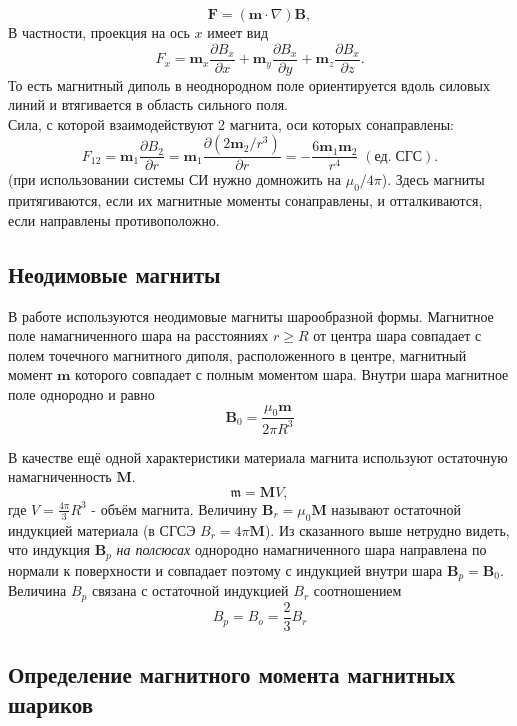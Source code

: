 \documentclass[a4paper, 12pt]{article}
\begin{document}
	\[\textbf{F} = (\mathbf{m} \cdot \nabla)\textbf{B},\]
	 В частности, проекция на ось $x$ имеет вид
	\begin{equation*}
		F_x = \mathbf{m}_x\frac{\partial B_x}{\partial x} + \mathbf{m}_y\frac{\partial B_x}{\partial y} + \mathbf{m}_z\frac{\partial B_x}{\partial z}.
	\end{equation*}
	То есть магнитный диполь в неоднородном поле ориентируется вдоль силовых линий и втягивается в область сильного поля.\\
	Сила, с которой взаимодействуют 2 магнита, оси которых сонаправлены:
	\begin{equation}
		\label{6}
		F_{12}= \mathbf{m}_1 \frac{\partial{B_2}}{\partial{r}} = \mathbf{m}_1\frac{\partial{(2\mathbf{m}_2/r^3)}}{\partial{r}} = -\frac{6 \mathbf{m}_1\mathbf{m}_2}{r^4} \;(\text{ед}.\; \text{СГС}).
	\end{equation}
	(при использовании системы СИ нужно домножить на $\mu_0 / 4\pi$). Здесь магниты притягиваются, если их магнитные моменты сонаправлены, и отталкиваются, если направлены противоположно.
	
	
	\subsection*{Неодимовые магниты}
	
	В работе используются неодимовые магниты шарообразной формы. Магнитное поле намагниченного шара на расстояниях $r \geq R$ от центра шара совпадает с полем точечного магнитного диполя, расположенного в центре, магнитный момент $\mathbf{m}$ которого совпадает с полным моментом шара. Внутри шара магнитное поле однородно и равно
	\[\textbf{B}_{0} = \frac{\mu_0 \mathbf{m}}{2\pi R^3}\]
	
	В качестве ещё одной характеристики материала магнита используют остаточную намагниченность $\textbf{M}$. $$\mathfrak{m}= \textbf{M}V ,$$ где $\displaystyle V = \frac{4\pi}{3}R^3$ - объём магнита. Величину $\textbf{B}_r = \mu_0 \textbf{M}$ называют остаточной индукцией материала (в СГСЭ $B_r = 4\pi \mathbf{M}$).
	Из сказанного выше нетрудно видеть, что индукция $\textbf{B}_p$ \textit{на полсюсах} однородно намагниченного шара направлена по нормали к поверхности и совпадает поэтому с индукцией внутри шара $\textbf{B}_p = \textbf{B}_0$. Величина $B_p$ связана с остаточной индукцией $B_r$ соотношением \[B_p = B_o = \frac{2}{3}B_r \]
	
	
	\subsection*{Определение магнитного момента магнитных шариков}
	
\end{document}
